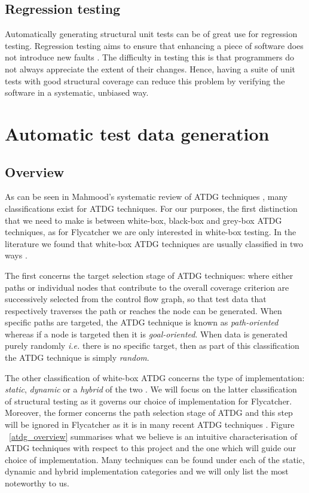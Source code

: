 \documentclass[a4paper,11pt,titlepage]{report}
\begin{document}
\subsection{Regression testing}
Automatically generating structural unit tests can be of great use for regression testing. Regression testing aims to ensure that enhancing a piece of software does not introduce new faults \cite{myers2011art}. The difficulty in testing this is that programmers do not always appreciate the extent of their changes. Hence, having a suite of unit tests with good structural coverage can reduce this problem by verifying the software in a systematic, unbiased way.

\section{Automatic test data generation}
\subsection{Overview}

As can be seen in Mahmood's systematic review of ATDG techniques \cite{mahmood2007systematic}, many classifications exist for ATDG techniques. For our purposes, the first distinction that we need to make is between white-box, black-box \cite{prasanna2005survey} and grey-box ATDG techniques, as for \textsf{Flycatcher} we are only interested in white-box testing. In the literature we found that white-box ATDG techniques are usually classified in two ways \cite{mahmood2007systematic, edvardsson1999survey, tahbildar2automated}.

The first concerns the target selection stage of ATDG techniques: where either paths or individual nodes that contribute to the overall coverage criterion are successively selected from the control flow graph, so that test data that respectively traverses the path or reaches the node can be generated. When specific paths are targeted, the ATDG technique is known as \emph{path-oriented} \cite{edvardsson1999survey} whereas if a node is targeted then it is \emph{goal-oriented}. When data is generated purely randomly \emph{i.e.} there is no specific target, then as part of this classification the ATDG technique is simply \emph{random}.

The other classification of white-box ATDG concerns the type of implementation: \emph{static}, \emph{dynamic} or a \emph{hybrid} of the two \cite{han2008empirical, mcminn2004search}. We will focus on the latter classification of structural testing as it governs our choice of implementation for \textsf{Flycatcher}. Moreover, the former concerns the path selection stage of ATDG and this step will be ignored in \textsf{Flycatcher} as it is in many recent ATDG techniques \cite{tahbildar2automated}. Figure ~\ref{atdg_overview} summarises what we believe is an intuitive characterisation of ATDG techniques with respect to this project and the one which will guide our choice of implementation. Many techniques can be found under each of the static, dynamic and hybrid implementation categories and we will only list the most noteworthy to us.
\end{document}

